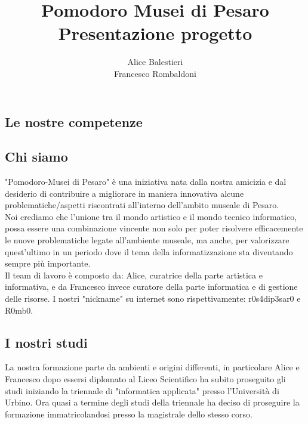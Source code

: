 \documentclass[hidelinks,12pt,a4paper]{article}
\begin{document}
	\begin{flushleft}
		
		\title{\textbf{Pomodoro Musei di Pesaro}\\\small{Presentazione progetto}}
		\author{Alice Balestieri\\ Francesco Rombaldoni}
		\date{}
		
		\maketitle
		
		\setcounter{page}{1}
		\newpage
		\tableofcontents
		\newpage
		
		\section{Le nostre competenze}
			\subsection{Chi siamo}
			"Pomodoro-Musei di Pesaro" è una iniziativa nata dalla nostra amicizia e dal desiderio di contribuire a migliorare in maniera innovativa alcune problematiche/aspetti riscontrati all'interno dell'ambito museale di Pesaro.\\
			Noi crediamo che l'unione tra il mondo artistico e il mondo tecnico informatico, possa essere una combinazione vincente non solo per poter risolvere efficacemente le nuove problematiche legate all'ambiente museale, ma anche, per valorizzare quest'ultimo in un periodo dove il tema della informatizzazione sta diventando sempre più importante.\\
			Il team di lavoro è composto da: Alice, curatrice della parte artistica e informativa, e da Francesco invece curatore della parte informatica e di gestione delle risorse. I nostri "nickname" su internet sono rispettivamente: r0s4dip3sar0 e R0mb0. 
			
			
			\subsection{I nostri studi}
			La nostra formazione parte da ambienti e origini differenti, in particolare Alice
			e Francesco dopo essersi diplomato al Liceo Scientifico ha subito proseguito gli studi iniziando la triennale di "informatica applicata" presso l'Università di Urbino. Ora quasi a termine degli studi della triennale ha deciso di proseguire la formazione immatricolandosi presso la magistrale dello stesso corso. 
			

\end{flushleft}
\end{document}
